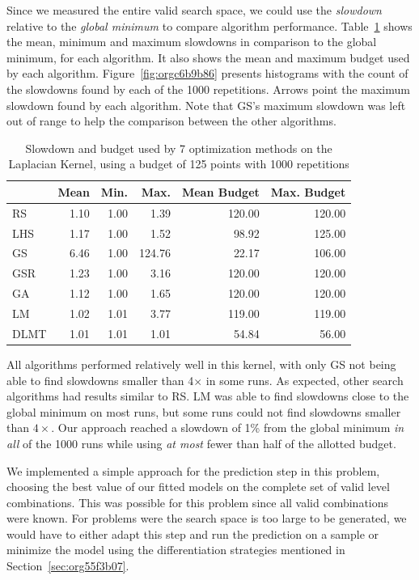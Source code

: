 \documentclass[conference]{IEEEtran}
\begin{document}
Since we measured the entire valid search space, we could use the \emph{slowdown}
relative to the \emph{global minimum} to compare algorithm performance.
Table~\ref{tab:gpu_laplacian_compare_budget} shows the mean, minimum and
maximum slowdowns in comparison to the global minimum, for each algorithm. It
also shows the mean and maximum budget used by each algorithm.
Figure~\ref{fig:orgc6b9b86} presents histograms with the
count of the slowdowns found by each of the 1000 repetitions. Arrows point the
maximum slowdown found by each algorithm. Note that GS's maximum slowdown was
left out of range to help the comparison between the other algorithms.

\begin{table}[b]
\centering
\caption{Slowdown and budget used by 7 optimization methods on the Laplacian Kernel, using a budget of 125 points with 1000 repetitions}
\label{tab:gpu_laplacian_compare_budget}
\begingroup\footnotesize
\begin{tabular}{lrrrrr}
  \toprule
 & Mean & Min. & Max. & Mean Budget & Max. Budget \\
  \midrule
RS & 1.10 & 1.00 & 1.39 & 120.00 & 120.00 \\
  LHS & 1.17 & 1.00 & 1.52 & 98.92 & 125.00 \\
  GS & 6.46 & 1.00 & 124.76 & 22.17 & 106.00 \\
  GSR & 1.23 & 1.00 & 3.16 & 120.00 & 120.00 \\
  GA & 1.12 & 1.00 & 1.65 & 120.00 & 120.00 \\
  LM & 1.02 & 1.01 & 3.77 & 119.00 & 119.00 \\
   \rowcolor{red!25}DLMT & 1.01 & 1.01 & 1.01 & 54.84 & 56.00 \\
   \bottomrule
\end{tabular}
\endgroup
\end{table}

All algorithms performed relatively well in this kernel, with only GS not being
able to find slowdowns smaller than 4\(\times\) in some runs. As expected, other
search algorithms had results similar to RS. LM was able to find slowdowns close
to the global minimum on most runs, but some runs could not find slowdowns
smaller than \(4\times\). Our approach reached a slowdown of 1\% from the global
minimum \emph{in all} of the 1000 runs while using \emph{at most} fewer than half of the
allotted budget.

We implemented a simple approach for the prediction step in this problem,
choosing the best value of our fitted models on the complete set of valid level
combinations. This was possible for this problem since all valid combinations
were known. For problems were the search space is too large to be generated, we
would have to either adapt this step and run the prediction on a sample or
minimize the model using the differentiation strategies mentioned in
Section~\ref{sec:org55f3b07}.
\end{document}
